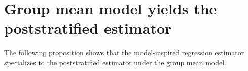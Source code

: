 

\section{Group mean model yields the poststratified estimator}
\setcounter{theorem}{0}
\setcounter{equation}{0}


\renewcommand{\theenumi}{\roman{enumi}}
\renewcommand{\labelenumi}{\textnormal{(\theenumi)}$\;\;$}


The following proposition shows that the model-inspired regression estimator specializes to
the poststratified estimator under the group mean model.
